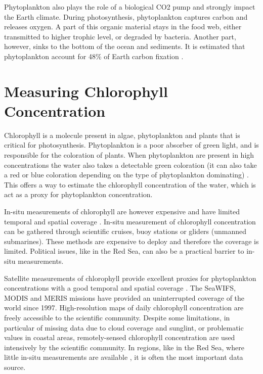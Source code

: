 Phytoplankton also plays the role of a biological CO2 pump and strongly impact the Earth climate. During photosynthesis, phytoplankton captures carbon and releases oxygen. A part of this organic material stays in the food web, either transmitted to higher trophic level, or degraded  by bacteria. Another part, however, sinks to the bottom of the ocean and sediments. It is estimated that phytoplankton account for 48\% of Earth carbon fixation \cite{Pal2014}.

\section{Measuring Chlorophyll Concentration}

Chlorophyll is a molecule present in algae, phytoplankton and plants that is critical for photosynthesis. Phytoplankton is a poor absorber of green light, and is responsible for the coloration of plants. When phytoplankton are present in high concentrations the water also takes a detectable green coloration (it can also take a red or blue coloration depending on the type of phytoplankton dominating) \cite{Robinson2010}. This offers a way to estimate the chlorophyll concentration of the water, which is act as a proxy for phytoplankton concentration. 

In-situ measurements of chlorophyll are however expensive and have limited temporal and spatial coverage \cite{Robinson2010}. In-situ measurement of chlorophyll concentration can be gathered through scientific cruises, buoy stations or gliders (unmanned submarines). These methods are expensive to deploy and therefore the coverage is limited. Political issues, like in the Red Sea, can also be a practical barrier to in-situ measurements. 

Satellite measurements of chlorophyll provide excellent proxies for phytoplankton concentrations with a good temporal and spatial coverage \cite{Robinson2010}. The SeaWIFS, MODIS and MERIS missions have provided an uninterrupted coverage of the world since 1997. High-resolution maps of daily chlorophyll concentration are freely accessible to the scientific community. Despite some limitations, in particular of missing data due to cloud coverage and sunglint, or problematic values in coastal areas, remotely-sensed chlorophyll concentration are used intensively by the scientific community. In regions, like in the Red Sea, where little in-situ measurements are available \cite{Raitsos2013}, it is often the most important data source.

